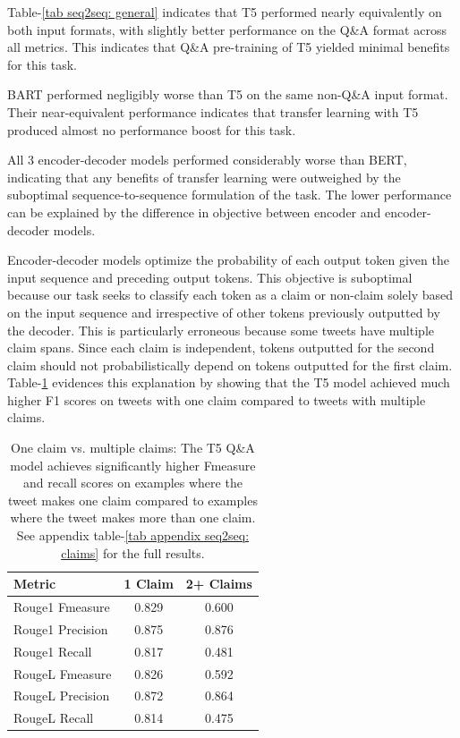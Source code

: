 \documentclass[11pt]{article}
\begin{document}
Table-\ref{tab seq2seq: general} indicates that T5 performed nearly equivalently on both input formats, with slightly better performance on the Q\&A format across all metrics. This indicates that Q\&A pre-training of T5 yielded minimal benefits for this task.

BART performed negligibly worse than T5 on the same non-Q\&A input format. Their near-equivalent performance indicates that transfer learning with T5 produced almost no performance boost for this task.

All 3 encoder-decoder models performed considerably worse than BERT, indicating that any benefits of transfer learning were outweighed by the suboptimal sequence-to-sequence formulation of the task. The lower performance can be explained by the difference in objective between encoder and encoder-decoder models.

Encoder-decoder models optimize the probability of each output token given the input sequence and preceding output tokens. This objective is suboptimal because our task seeks to classify each token as a claim or non-claim solely based on the input sequence and irrespective of other tokens previously outputted by the decoder. This is particularly erroneous because some tweets have multiple claim spans. Since each claim is independent, tokens outputted for the second claim should not probabilistically depend on tokens outputted for the first claim. Table-\ref{tab seq2seq: claims} evidences this explanation by showing that the T5 model achieved much higher F1 scores on tweets with one claim compared to tweets with multiple claims.




\begin{table}[]
\begin{tabular}{l c c}
\hline
\textbf{Metric} & \textbf{1 Claim} & \textbf{2+ Claims}\\
\hline
Rouge1 Fmeasure & 0.829 & 0.600\\
\phantom{X}Rouge1 Precision & 0.875 & 0.876\\
\phantom{X}Rouge1 Recall & 0.817 & 0.481\\
RougeL Fmeasure & 0.826 & 0.592\\
\phantom{X}RougeL Precision & 0.872 & 0.864\\
\phantom{X}RougeL Recall & 0.814 & 0.475\\
\hline
\end{tabular}

\caption{One claim vs. multiple claims: The T5 Q\&A model achieves significantly higher Fmeasure and recall scores on examples where the tweet makes one claim compared to examples where the tweet makes more than one claim. See appendix table-\ref{tab appendix seq2seq: claims} for the full results.}
\label{tab seq2seq: claims}
\end{table}
\end{document}
